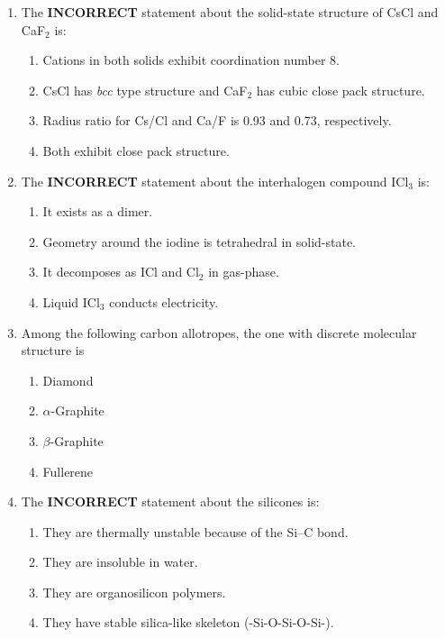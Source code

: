 \documentclass[journal,12pt,onecolumn]{IEEEtran}
\theoremstyle{remark}
\begin{document}
\begin{enumerate}
\newpage


\item The \textbf{INCORRECT} statement about the solid-state structure of CsCl and CaF$_2$ is: \hfill{}

\begin{enumerate}
    \item Cations in both solids exhibit coordination number 8.
    \item CsCl has \textit{bcc} type structure and CaF$_2$ has cubic close pack structure.
    \item Radius ratio for Cs/Cl and Ca/F is 0.93 and 0.73, respectively.
    \item Both exhibit close pack structure.
\end{enumerate}


\item The \textbf{INCORRECT} statement about the interhalogen compound ICl$_3$ is: \hfill{}

\begin{enumerate}
    \item It exists as a dimer.
    \item Geometry around the iodine is tetrahedral in solid-state.
    \item It decomposes as ICl and Cl$_2$ in gas-phase.
    \item Liquid ICl$_3$ conducts electricity.
\end{enumerate}


\item Among the following carbon allotropes, the one with discrete molecular structure is \hfill{}

\begin{enumerate}
    \item Diamond
    \item $\alpha$-Graphite
    \item $\beta$-Graphite
    \item Fullerene
\end{enumerate}


\item The \textbf{INCORRECT} statement about the silicones is: \hfill{}

\begin{enumerate}
    \item They are thermally unstable because of the Si--C bond.
    \item They are insoluble in water.
    \item They are organosilicon polymers.
    \item They have stable silica-like skeleton (-Si-O-Si-O-Si-).
\end{enumerate}



\end{enumerate}
\end{document}
